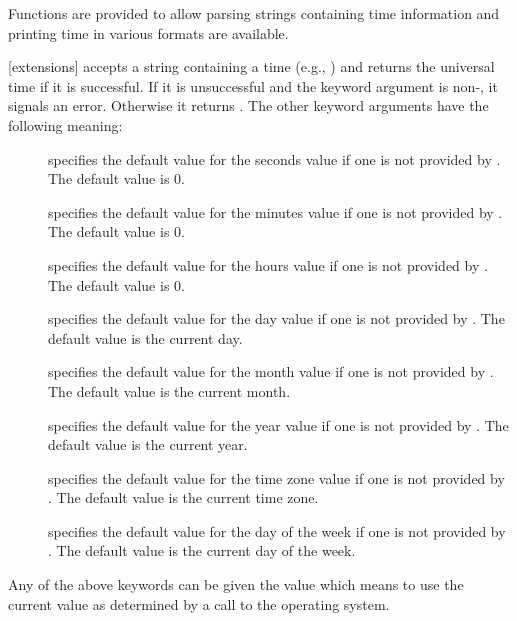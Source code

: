  
Functions are provided to allow parsing strings containing time information
and printing time in various formats are available.

[extensions]{
       }
 accepts a string containing a time (e.g., 
)
and returns the universal time if it is successful.  If it is unsuccessful
and the keyword argument  is non-\FALSE, it signals an
error.  Otherwise it returns \FALSE.  The other keyword arguments have the
following meaning:
\begin{description}

\item[]
specifies the default value for the seconds value if
one is not provided by .  The default value is 0.

\item[]
specifies the default value for the minutes value if
one is not provided by .  The default value is 0.

\item[]
specifies the default value for the hours value if
one is not provided by .  The default value is 0.

\item[]
specifies the default value for the day value if one is
not provided by .  The default value is the current day.

\item[]
specifies the default value for the month value if one
is not provided by .  The default value is the current
month.

\item[]
specifies the default value for the year value if one is
not provided by .  The default value is the current year.

\item[]
specifies the default value for the time zone value if
one is not provided by .  The default value is the current
time zone.

\item[]
specifies the default value for the day of the week
if one is not provided by .  The default value is the
current day of the week.
\end{description}
Any of the above keywords can be given the value  which means
to use the current value as determined by a call to the operating system.
\enddefun

